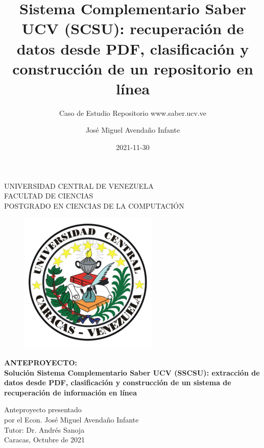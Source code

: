 \documentclass[
  10,
  openany]{book}
\title{Sistema Complementario Saber UCV (SCSU): recuperación de datos desde PDF, clasificación y construcción de un repositorio en línea}
\subtitle{Caso de Estudio Repositorio www.saber.ucv.ve}
\author{José Miguel Avendaño Infante}
\date{2021-11-30}
\begin{document}
\maketitle


\begin{center}
	UNIVERSIDAD CENTRAL DE VENEZUELA\\
	FACULTAD DE CIENCIAS\\
	POSTGRADO EN CIENCIAS DE LA COMPUTACI\'ON\\

	\begin{figure}
						\centering
						  \includegraphics[height=.7\textwidth]{images/UCV.png}
  \end{figure}
  \vspace{1.5cm}
  \large{\textbf{ANTEPROYECTO:\\ Solución Sistema Complementario Saber UCV (SSCSU): extracción de datos desde PDF, clasificación y construcción de un sistema de recuperación de información en línea}}

  \vspace{3cm}
  Anteproyecto presentado  \\
  por el Econ. José Miguel Avendaño Infante\\
  Tutor: Dr. Andrés Sanoja\\
  \vspace{1.5cm}
  Caracas, Octubre de 2021
\end{center}




\end{document}
